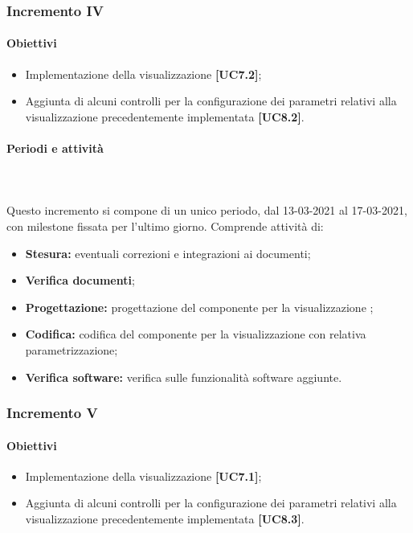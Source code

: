 \subsubsection{Incremento IV}

\paragraph{Obiettivi}
\begin{itemize}
\item Implementazione della visualizzazione  \textbf{[UC7.2]};
\item Aggiunta di alcuni controlli per la configurazione dei parametri relativi alla visualizzazione precedentemente implementata \textbf{[UC8.2]}.
\end{itemize}

\paragraph{Periodi e attività} \mbox{}\\\mbox{}\\
Questo incremento si compone di un unico periodo, dal 13-03-2021 al 17-03-2021, con milestone fissata per l'ultimo giorno. Comprende attività di:
\begin{itemize}
\item \textbf{Stesura:} eventuali correzioni e integrazioni ai documenti;
\item \textbf{Verifica documenti};
\item \textbf{Progettazione:} progettazione del componente per la visualizzazione ;
\item \textbf{Codifica:} codifica del componente per la visualizzazione con relativa parametrizzazione;
\item \textbf{Verifica software:} verifica sulle funzionalità software aggiunte.
\end{itemize}


\subsubsection{Incremento V}

\paragraph{Obiettivi}
\begin{itemize}
\item Implementazione della visualizzazione  \textbf{[UC7.1]};
\item Aggiunta di alcuni controlli per la configurazione dei parametri relativi alla visualizzazione precedentemente implementata \textbf{[UC8.3]}.
\end{itemize}

